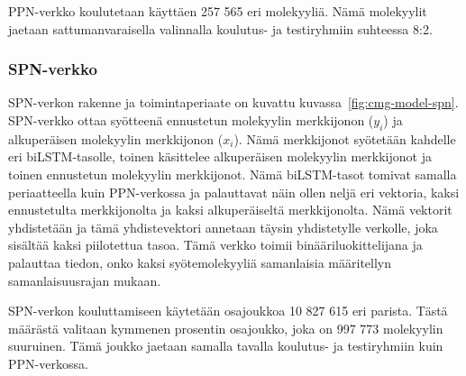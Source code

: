 \documentclass[finnish,twoside,censored,tkt,sw-line]{HYthesisML}
\begin{document}
PPN-verkko koulutetaan käyttäen 257 565 eri molekyyliä.
Nämä molekyylit jaetaan sattumanvaraisella valinnalla koulutus- ja testiryhmiin suhteessa 8:2.

\subsubsection{SPN-verkko}

SPN-verkon rakenne ja toimintaperiaate on kuvattu kuvassa~\ref{fig:cmg-model-spn}.
SPN-verkko ottaa syötteenä ennustetun molekyylin merkkijonon (\(y_i\)) ja alkuperäisen molekyylin merkkijonon (\(x_i\)).
Nämä merkkijonot syötetään kahdelle eri biLSTM-tasolle, toinen käsittelee alkuperäisen molekyylin merkkijonot ja toinen ennustetun molekyylin merkkijonot.
Nämä biLSTM-tasot tomivat samalla periaatteella kuin PPN-verkossa ja palauttavat näin ollen neljä eri vektoria, kaksi ennustetulta merkkijonolta ja kaksi alkuperäiseltä merkkijonolta.
Nämä vektorit yhdistetään ja tämä yhdistevektori annetaan täysin yhdistetylle verkolle, joka sisältää kaksi piilotettua tasoa.
Tämä verkko toimii binääriluokittelijana ja palauttaa tiedon, onko kaksi syötemolekyyliä samanlaisia määritellyn samanlaisuusrajan mukaan.

SPN-verkon kouluttamiseen käytetään osajoukkoa 10 827 615 eri parista.
Tästä määrästä valitaan kymmenen prosentin osajoukko, joka on 997 773 molekyylin suuruinen.
Tämä joukko jaetaan samalla tavalla koulutus- ja testiryhmiin kuin PPN-verkossa.
\end{document}
